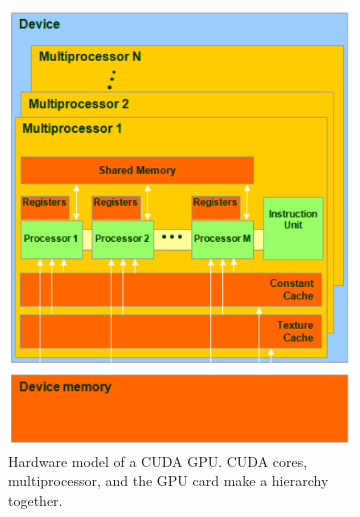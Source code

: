 \begin{figure}
    \centering
    \begin{subfigure}[b]{0.46\textwidth}
                \includegraphics[width=\textwidth]{fig/cuda-hw.png}
                \caption{Hardware model of a CUDA GPU. 
                CUDA cores, multiprocessor, and the GPU card
                make a hierarchy together.}
                \label{fig:cuda-hw}
        \end{subfigure}
\quad
    \begin{subfigure}[b]{0.42\textwidth}

\end{subfigure}
\end{figure}
